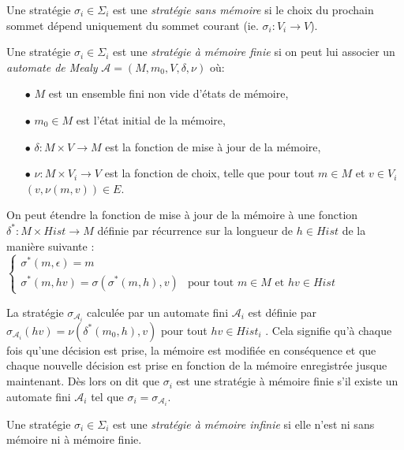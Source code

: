 \begin{defi}
	
	Une stratégie $\sigma _{i} \in \Sigma _{i}$ est une \textit{stratégie sans mémoire} si le choix du prochain sommet dépend uniquement du sommet courant (ie. $\sigma _{i}: V_{i} \rightarrow V$).
\end{defi}

\begin{defi}
	
	Une stratégie $\sigma _{i} \in \Sigma _{i}$ est une \textit{stratégie à mémoire finie} si on peut lui associer un \textit{automate de Mealy} $\mathcal{A} = (M, m_{0}, V, \delta, \nu)$ où:
	\begin{enumerate}
		\item[$\bullet$] $M$ est un ensemble fini non vide d'états de mémoire,
		\item[$\bullet$] $m_{0} \in M$ est l'état initial de la mémoire,
		\item[$\bullet$] $\delta : M \times V \rightarrow M$ est la fonction de mise à jour de la mémoire,
		\item[$\bullet$] $ \nu: M \times V_{i} \rightarrow V$ est la fonction de choix, telle que pour tout $m \in M$ et $v\in V_{i}$ $(v, \nu(m,v))\in E$.\end{enumerate}
		
		On peut étendre la fonction de mise à jour de la mémoire à une fonction $\delta ^{*}: M \times Hist \rightarrow M$ définie par récurrence sur la longueur de $h \in Hist$ de la manière suivante :\\ $\begin{cases}
																	\sigma^{*}(m,\epsilon) = m	\\
																	\sigma^{*}(m,hv)=\sigma(\sigma^{*}(m,h),v) & \text{pour tout } m\in M \text{ et } hv\in Hist
																	\end{cases}$ 
																	
		La stratégie $\sigma _{\mathcal{A}_{i}}$ calculée par un automate fini $\mathcal{A}_{i}$ est définie par $\sigma _{\mathcal{A}_{i}}(hv) = \nu(\delta^{*}(m_{0},h),v)$ pour tout $hv \in Hist_{i}$ . Cela signifie qu'à chaque fois qu'une décision est prise, la mémoire est modifiée en conséquence et que chaque nouvelle décision est prise en fonction de la mémoire enregistrée jusque maintenant.
		Dès lors on dit que $\sigma _{i}$ est une stratégie à mémoire finie s'il existe un automate fini $\mathcal{A}_{i}$ tel que $\sigma _{i} = \sigma _{\mathcal{A}_{i}}$.		

\end{defi}

\begin{defi}
	
	Une stratégie $\sigma _{i} \in \Sigma _{i}$ est une \textit{stratégie à mémoire infinie } si elle n'est ni sans mémoire ni à mémoire finie.
\end{defi}
